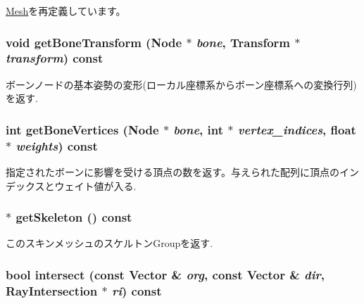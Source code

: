 \hyperlink{classm3g_1_1Mesh_52ce6d0b3eda2bd3a95bfb5b7dbb6f82}{Mesh}を再定義しています。\hypertarget{classm3g_1_1SkinnedMesh_e6c2fed8109053ded845e49f5c3b0c73}{
\subsubsection[{getBoneTransform}]{\setlength{\rightskip}{0pt plus 5cm}void getBoneTransform ({\bf Node} $\ast$ {\em bone}, \/  {\bf Transform} $\ast$ {\em transform}) const}}
\label{classm3g_1_1SkinnedMesh_e6c2fed8109053ded845e49f5c3b0c73}


ボーンノードの基本姿勢の変形(ローカル座標系からボーン座標系への変換行列)を返す. \hypertarget{classm3g_1_1SkinnedMesh_84ec0935b92b7ccc0aed7e66c4eac78f}{
\subsubsection[{getBoneVertices}]{\setlength{\rightskip}{0pt plus 5cm}int getBoneVertices ({\bf Node} $\ast$ {\em bone}, \/  int $\ast$ {\em vertex\_\-indices}, \/  float $\ast$ {\em weights}) const}}
\label{classm3g_1_1SkinnedMesh_84ec0935b92b7ccc0aed7e66c4eac78f}


指定されたボーンに影響を受ける頂点の数を返す。与えられた配列に頂点のインデックスとウェイト値が入る. \hypertarget{classm3g_1_1SkinnedMesh_ce7d69c2b600f6f01a46214db28e6f92}{
\subsubsection[{getSkeleton}]{ $\ast$ getSkeleton () const}}
\label{classm3g_1_1SkinnedMesh_ce7d69c2b600f6f01a46214db28e6f92}


このスキンメッシュのスケルトンGroupを返す. \hypertarget{classm3g_1_1SkinnedMesh_dc812d8230f94f0b6b8e4fecdb802a16}{
\subsubsection[{intersect}]{\setlength{\rightskip}{0pt plus 5cm}bool intersect (const {\bf Vector} \& {\em org}, \/  const {\bf Vector} \& {\em dir}, \/  {\bf RayIntersection} $\ast$ {\em ri}) const}}
\label{classm3g_1_1SkinnedMesh_dc812d8230f94f0b6b8e4fecdb802a16}


